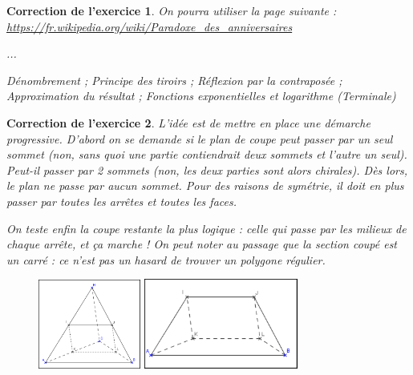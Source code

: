 \documentclass[12pt]{article}
\theoremstyle{break}
\newtheorem{cor}{Correction de l'exercice}
\begin{document}
\begin{cor}
On pourra utiliser la page suivante : \url{https://fr.wikipedia.org/wiki/Paradoxe_des_anniversaires}

...

\textit{Dénombrement ; Principe des tiroirs ; Réflexion par la contraposée ; Approximation du résultat ; Fonctions exponentielles et logarithme (Terminale)}
\end{cor}


\begin{cor}
L'idée est de mettre en place une démarche progressive. D'abord on se demande si le plan de coupe peut passer par un seul sommet (non, sans quoi une partie contiendrait deux sommets et l'autre un seul). Peut-il passer par 2 sommets (non, les deux parties sont alors chirales). Dès lors, le plan ne passe par aucun sommet. Pour des raisons de symétrie, il doit en plus passer par toutes les arrêtes et toutes les faces.

On teste enfin la coupe restante la plus logique : celle qui passe par les milieux de chaque arrête, et ça marche ! On peut noter au passage que la section coupé est un carré : ce n'est pas un hasard de trouver un polygone régulier.

\begin{figure}[h!]
	\centering
    \includegraphics[width=0.3\textwidth]{CoupeTetraedreAvecSolution.png}
    \includegraphics[width=0.45\textwidth]{CoupeTetraedreAvecSolution2.png}
\end{figure}
\end{cor}
\end{document}
